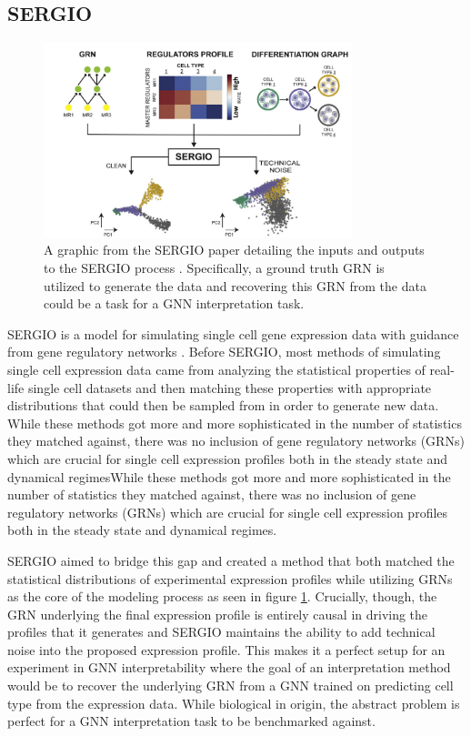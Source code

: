 \subsection{SERGIO}
\begin{figure}[h]
	\centering
	\includegraphics[width=0.8\textwidth]{images/sergio.png}
	\caption{A graphic from the SERGIO paper detailing the inputs and outputs to the SERGIO process \cite{dibaeinia_sergio_2020}. Specifically, a ground truth GRN is utilized to generate the data and recovering this GRN from the data could be a task for a GNN interpretation task.}
	\label{fig:sergio}
\end{figure}
SERGIO is a model for simulating single cell gene expression data with guidance from gene regulatory networks \cite{dibaeinia_sergio_2020}. Before SERGIO, most methods of simulating single cell expression data came from analyzing the statistical properties of real-life single cell datasets and then matching these properties with appropriate distributions that could then be sampled from in order to generate new data. While these methods got more and more sophisticated in the number of statistics they matched against, there was no inclusion of gene regulatory networks (GRNs) which are crucial for single cell expression profiles both in the steady state and dynamical regimesWhile these methods got more and more sophisticated in the number of statistics they matched against, there was no inclusion of gene regulatory networks (GRNs) which are crucial for single cell expression profiles both in the steady state and dynamical regimes.

SERGIO aimed to bridge this gap and created a method that both matched the statistical distributions of experimental expression profiles while utilizing GRNs as the core of the modeling process as seen in figure \ref{fig:sergio}. Crucially, though, the GRN underlying the final expression profile is entirely causal in driving the profiles that it generates and SERGIO maintains the ability to add technical noise into the proposed expression profile. This makes it a perfect setup for an experiment in GNN interpretability where the goal of an interpretation method would be to recover the underlying GRN from a GNN trained on predicting cell type from the expression data. While biological in origin, the abstract problem is perfect for a GNN interpretation task to be benchmarked against.
\newpage
